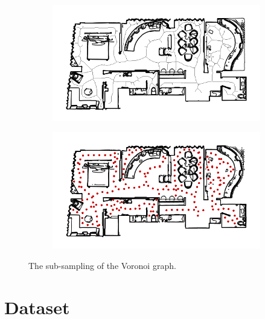 \begin{figure}[h!]
	\centering
	\begin{subfigure}[b]{0.49\linewidth}
		\centering
		\includegraphics[width=\textwidth]{images/pose_estimator_skelethon_map.png}
		\caption{}
		\label{fig:pose_estimator_voronoi_graph}
	\end{subfigure}
	\hfil
	\begin{subfigure}[b]{0.49\linewidth}
		\centering
		\includegraphics[width=\textwidth]{images/pose_estimator_subsampled.png}
		\caption{}
		\label{fig:pose_estimator_subsampled}
	\end{subfigure}
	\caption{The sub-sampling of the Voronoi graph.}
\end{figure}

\section{Dataset}

